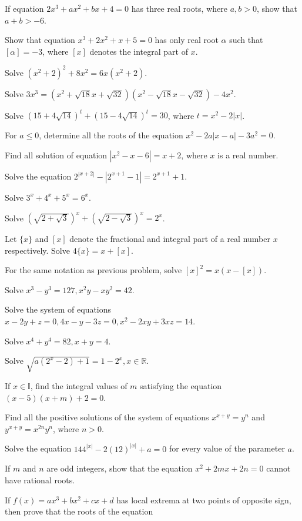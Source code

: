 \item If equation $2x^3 + ax^2 + bx + 4 = 0$ has three real roots, where $a, b > 0$, show that $a + b>-6$.
\item Show that equation $x^3 + 2x^2 + x + 5 = 0$ has only real root $\alpha$ such that $[\alpha] = -3$, where $[x]$ denotes the
  integral part of $x$.
\item Solve $(x^2 + 2)^2 + 8x^2 = 6x(x^2 + 2)$.
\item Solve $3x^3 = (x^2 + \sqrt{18}x + \sqrt{32})(x^2 - \sqrt{18}x - \sqrt{32}) - 4x^2$.
\item Solve $(15 + 4\sqrt{14})^t + (15 - 4\sqrt{14})^t = 30$, where $t = x^2 - 2|x|$.
\item For $a\leq 0$, determine all the roots of the equation $x^2 - 2a|x - a| - 3a^2 = 0$.
\item Find all solution of equation $|x^2 - x - 6| = x + 2$, where $x$ is a real number.
\item Solve the equation $2^{|x + 2|} - |2^{x + 1} - 1| = 2^{x + 1} + 1$.
\item Solve $3^x + 4^x + 5^x = 6^x$.
\item Solve $(\sqrt{2 + \sqrt{3}})^x + (\sqrt{2 - \sqrt{3}})^x = 2^x$.
\item Let $\{x\}$ and $[x]$ denote the fractional and integral part of a real number $x$ respectively. Solve $4\{x\} = x + [x]$.
\item For the same notation as previous problem, solve $[x]^2 = x(x - [x])$.
\item Solve $x^3 - y^3 = 127, x^2y - xy^2 = 42$.
\item Solve the system of equations $x - 2y + z = 0, 4x- y - 3z = 0, x^2 - 2xy + 3xz = 14$.
\item Solve $x^4 + y^4 = 82, x + y = 4$.
\item Solve $\sqrt{a(2^x - 2) + 1} = 1 - 2^x, x\in\mathbb{R}$.
\item If $x\in\mathbb{I}$, find the integral values of $m$ satisfying the equation $(x - 5)(x + m) + 2 = 0$.
\item Find all the positive solutions of the system of equations $x^{x + y} = y^n$ and $y^{x + y} = x^{2n}y^n$, where $n > 0$.
\item Solve the equation $144^{|x|} - 2(12)^{|x|} + a = 0$ for every value of the parameter $a$.
\item If $m$ and $n$ are odd integers, show that the equation $x^2 + 2mx + 2n = 0$ cannot have rational roots.
\item If $f(x) = ax^3 + bx^2 + cx + d$ has local extrema at two points of opposite sign, then prove that the roots of the equation
